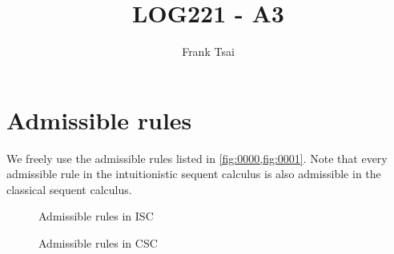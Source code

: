 \documentclass[a4paper]{article}
\title{LOG221 - A3}
\author{Frank Tsai}
\begin{document}
\maketitle

\section*{Admissible rules}

We freely use the admissible rules listed in \cref{fig:0000,fig:0001}.
Note that every admissible rule in the intuitionistic sequent calculus is also admissible in the classical sequent calculus.

\begin{figure}[h]
  \centering

  \caption{Admissible rules in ISC}
  \label{fig:0000}
\end{figure}
\begin{figure}[h]
  \centering
  \begin{mathpar}
  \end{mathpar}
  \caption{Admissible rules in CSC}
  \label{fig:0001}
\end{figure}
\end{document}
